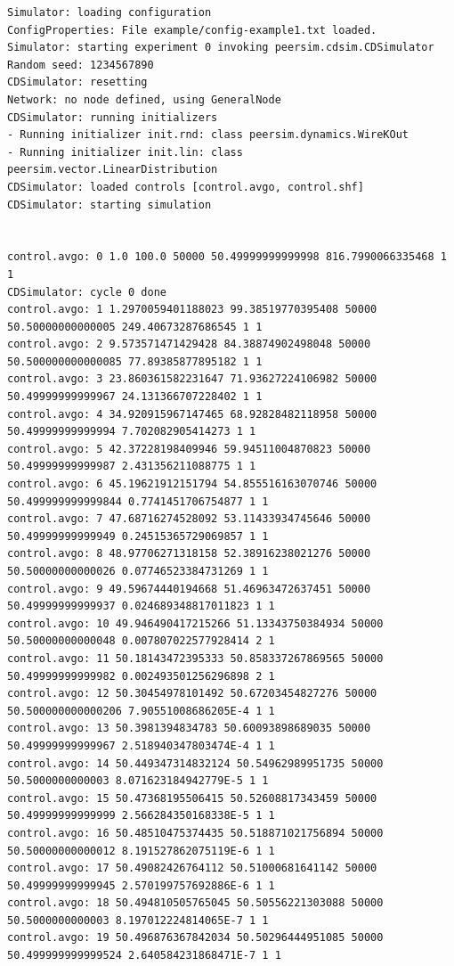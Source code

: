 \documentclass[a4paper,11pt]{article}
\begin{document}
\tiny
\begin{verbatim}
Simulator: loading configuration
ConfigProperties: File example/config-example1.txt loaded.
Simulator: starting experiment 0 invoking peersim.cdsim.CDSimulator
Random seed: 1234567890
CDSimulator: resetting
Network: no node defined, using GeneralNode
CDSimulator: running initializers
- Running initializer init.rnd: class peersim.dynamics.WireKOut
- Running initializer init.lin: class peersim.vector.LinearDistribution
CDSimulator: loaded controls [control.avgo, control.shf]
CDSimulator: starting simulation


control.avgo: 0 1.0 100.0 50000 50.49999999999998 816.7990066335468 1 1
CDSimulator: cycle 0 done
control.avgo: 1 1.2970059401188023 99.38519770395408 50000 50.50000000000005 249.40673287686545 1 1
control.avgo: 2 9.573571471429428 84.38874902498048 50000 50.500000000000085 77.89385877895182 1 1
control.avgo: 3 23.860361582231647 71.93627224106982 50000 50.49999999999967 24.131366707228402 1 1
control.avgo: 4 34.920915967147465 68.92828482118958 50000 50.49999999999994 7.702082905414273 1 1
control.avgo: 5 42.37228198409946 59.94511004870823 50000 50.49999999999987 2.431356211088775 1 1
control.avgo: 6 45.19621912151794 54.855516163070746 50000 50.499999999999844 0.7741451706754877 1 1
control.avgo: 7 47.68716274528092 53.11433934745646 50000 50.49999999999949 0.24515365729069857 1 1
control.avgo: 8 48.97706271318158 52.38916238021276 50000 50.50000000000026 0.07746523384731269 1 1
control.avgo: 9 49.59674440194668 51.46963472637451 50000 50.49999999999937 0.024689348817011823 1 1
control.avgo: 10 49.946490417215266 51.13343750384934 50000 50.50000000000048 0.007807022577928414 2 1
control.avgo: 11 50.18143472395333 50.858337267869565 50000 50.49999999999982 0.002493501256296898 2 1
control.avgo: 12 50.30454978101492 50.67203454827276 50000 50.500000000000206 7.90551008686205E-4 1 1
control.avgo: 13 50.3981394834783 50.60093898689035 50000 50.49999999999967 2.518940347803474E-4 1 1
control.avgo: 14 50.449347314832124 50.54962989951735 50000 50.5000000000003 8.071623184942779E-5 1 1
control.avgo: 15 50.47368195506415 50.52608817343459 50000 50.49999999999999 2.566284350168338E-5 1 1
control.avgo: 16 50.48510475374435 50.518871021756894 50000 50.50000000000012 8.191527862075119E-6 1 1
control.avgo: 17 50.49082426764112 50.51000681641142 50000 50.49999999999945 2.570199757692886E-6 1 1
control.avgo: 18 50.494810505765045 50.50556221303088 50000 50.5000000000003 8.197012224814065E-7 1 1
control.avgo: 19 50.496876367842034 50.50296444951085 50000 50.499999999999524 2.640584231868471E-7 1 1

\end{verbatim}
\end{document}
